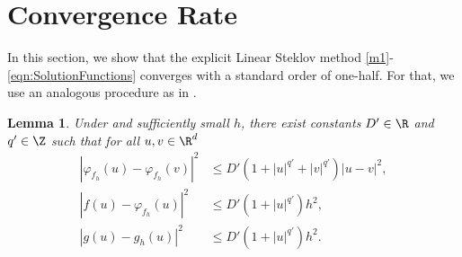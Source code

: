 \documentclass[sort&compress, preprint]{elsarticle}
\theoremstyle{definition}
\theoremstyle{plain}%
\newtheorem{lem}{Lemma}[section]
\theoremstyle{remark}
\begin{document}

	\section{Convergence Rate}
 
 In this section, we show that the explicit Linear Steklov method 
 \eqref{m1}-\eqref{eqn:SolutionFunctions} converges  with a standard order of one-half. For that,
 we use an analogous procedure as in \cite{Higham2002b}.
 
\begin{lem}
	Under  and sufficiently small $h$, there exist
	constants $D'\in \R$ and $q'\in \Z$ such that for all $u,v\in \R^d$
	\begin{align}
		|
			\varphi_{f_h}(u)
			-\varphi_{f_h}(v)
		|^2 
		&\leq
			D'
			\left(
				1 +|u|^{q'} +|v|^{q'}
			\right)
			|u-v|^2, \\
		|
			 f(u) -\varphi_{f_h}(u)
		|^2 
		&\leq
			D'
			\left(
				1 +|u|^{q'} 
				\right)
			h^2, \\
		|
			g(u) -g_h(u)
		|^2 				 
		&\leq
			D'
			\left(
				1 +|u|^{q'} 
			\right)
			h^2 . \label{eqn:ghPolyGrowth}
	\end{align}
\end{lem}
\end{document}
